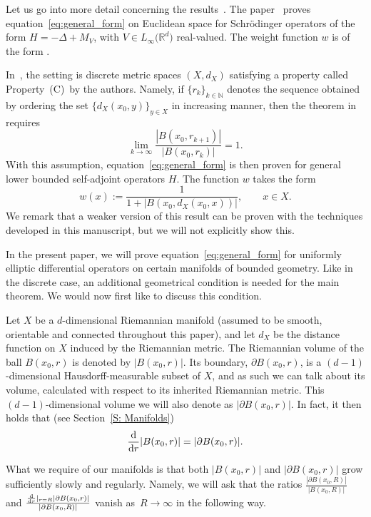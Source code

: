 \documentclass[pdftex]{sigma}
\numberwithin{equation}{section}
\begin{document}
Let us go into more detail concerning the results~\cite{AHMSZ,AMSZ}. The paper~\cite{AMSZ} proves equation~\eqref{eq:general_form} on Euclidean space for Schr\"odinger operators of the form $H = -\Delta + M_V$, with $V\in L_\infty\big(\mathbb{R}^d\big)$ real-valued. The weight function $w$ is of the form .

In~\cite{AHMSZ}, the setting is discrete metric spaces $(X, d_X)$ satisfying a property called Property~(C)~by the authors. Namely, if $\{r_k\}_{k\in \mathbb{N}}$ denotes the sequence obtained by ordering the set $\{d_X\!(x_0, y)\}_{y{\in} X}$ in increasing manner, then the theorem in~\cite{AHMSZ} requires
\begin{equation}\tag{C}\label{eq:Property_C}
 \lim_{k\to \infty} \frac{|B(x_0, r_{k+1})|}{|B(x_0, r_{k})|} =1.
\end{equation}
With this assumption, equation~\eqref{eq:general_form} is then proven for general lower bounded self-adjoint operators $H$. The function $w$ takes the form
\[
w(x) := \frac{1}{1+|B(x_0, d_X(x_0, x))|}, \qquad x \in X.
\]
We remark that a weaker version of this result can be proven with the techniques developed in this manuscript, but we will not explicitly show this.

In the present paper, we will prove equation~\eqref{eq:general_form} for uniformly elliptic differential operators on certain manifolds of bounded geometry. Like in the discrete case, an additional geometrical condition is needed for the main theorem. We would now first like to discuss this condition.

Let $X$ be a $d$-dimensional Riemannian manifold (assumed to be smooth, orientable and connected throughout this paper), and let $d_X$ be the distance function on $X$ induced by the Riemannian metric. The Riemannian volume of the ball $B(x_0, r)$ is denoted by $|B(x_0, r)|$. Its boundary, $\partial B(x_0, r)$, is a $(d-1)$-dimensional Hausdorff-measurable subset of $X$, and as such we can talk about its volume, calculated with respect to its inherited Riemannian metric. This $(d-1)$-dimensional volume we will also denote as $|\partial B(x_0, r)|$. In fact, it then holds that (see Section~\ref{S: Manifolds})
\[
\frac{{\rm d}}{{\rm d}r}|B(x_0, r)|=|\partial B(x_0, r)|.
\]

What we require of our manifolds is that both $|B(x_0,r)|$ and $|\partial B(x_0,r)|$ grow sufficiently slowly and regularly. Namely, we will ask that the ratios $\frac{|\partial B(x_0,R)|}{|B(x_0,R)|}$ and $\frac{\frac{{\rm d}}{{\rm d}r}|_{r=R}|\partial B(x_0,r)|}{|\partial B(x_0,R)|}$ vanish as~${R\to\infty}$ in the following way.
\end{document}
